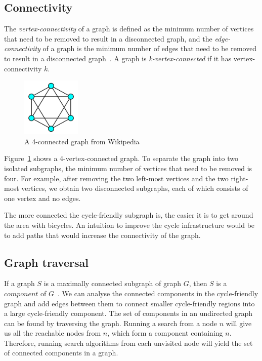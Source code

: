 \documentclass[12pt,a4paper]{report}
\begin{document}
\subsection{Connectivity}
The \textit{vertex-connectivity} of a graph is defined as the minimum number of vertices that need to be removed to result in a disconnected graph, and the \textit{edge-connectivity} of a graph is the minimum number of edges that need to be removed to result in a disconnected graph~\cite{buckley1990distance}. A graph is \textit{k-vertex-connected} if it has vertex-connectivity $k$.

\begin{figure}[ht]
    \centering
    \includegraphics[width=0.25\textwidth]{diss_images/context/connectivity.png}
    \caption{A 4-connected graph from Wikipedia~\cite{WikipediaEN:Connectivity}}
    \label{fig:connectivity4}
\end{figure}

Figure~\ref{fig:connectivity4} shows a 4-vertex-connected graph. To separate the graph into two isolated subgraphs, the minimum number of vertices that need to be removed is four. For example, after removing the two left-most vertices and the two right-most vertices, we obtain two disconnected subgraphs, each of which consists of one vertex and no edges. 

The more connected the cycle-friendly subgraph is, the easier it is to get around the area with bicycles. An intuition to improve the cycle infrastructure would be to add paths that would increase the connectivity of the graph.

\subsection{Graph traversal}
If a graph $S$ is a maximally connected subgraph of graph $G$, then $S$ is a $component$ of $G$~\cite{citeulike:395714}. We can analyse the connected components in the cycle-friendly graph and add edges between them to connect smaller cycle-friendly regions into a large cycle-friendly component. The set of components in an undirected graph can be found by traversing the graph. Running a search from a node $n$ will give us all the reachable nodes from $n$, which form a component containing $n$. Therefore, running search algorithms from each unvisited node will yield the set of connected components in a graph.
\end{document}
